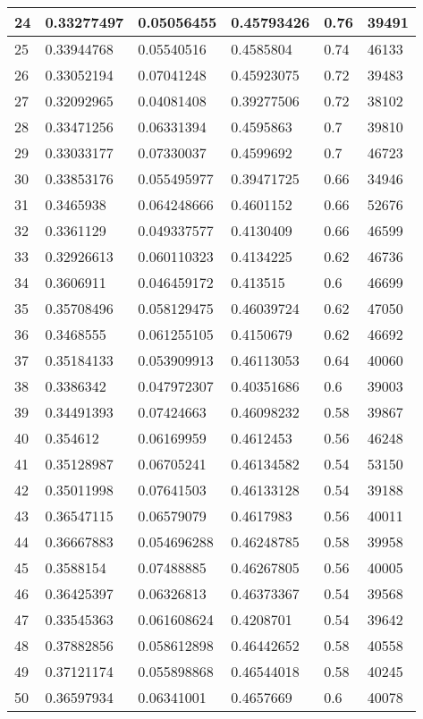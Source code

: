 \begin{longtable}{|l|l|l|l|l|l|}
24 & 0.33277497 & 0.05056455 & 0.45793426 & 0.76 & 39491 \\ \hline 
25 & 0.33944768 & 0.05540516 & 0.4585804 & 0.74 & 46133 \\ \hline 
26 & 0.33052194 & 0.07041248 & 0.45923075 & 0.72 & 39483 \\ \hline 
27 & 0.32092965 & 0.04081408 & 0.39277506 & 0.72 & 38102 \\ \hline 
28 & 0.33471256 & 0.06331394 & 0.4595863 & 0.7 & 39810 \\ \hline 
29 & 0.33033177 & 0.07330037 & 0.4599692 & 0.7 & 46723 \\ \hline 
30 & 0.33853176 & 0.055495977 & 0.39471725 & 0.66 & 34946 \\ \hline 
31 & 0.3465938 & 0.064248666 & 0.4601152 & 0.66 & 52676 \\ \hline 
32 & 0.3361129 & 0.049337577 & 0.4130409 & 0.66 & 46599 \\ \hline 
33 & 0.32926613 & 0.060110323 & 0.4134225 & 0.62 & 46736 \\ \hline 
34 & 0.3606911 & 0.046459172 & 0.413515 & 0.6 & 46699 \\ \hline 
35 & 0.35708496 & 0.058129475 & 0.46039724 & 0.62 & 47050 \\ \hline 
36 & 0.3468555 & 0.061255105 & 0.4150679 & 0.62 & 46692 \\ \hline 
37 & 0.35184133 & 0.053909913 & 0.46113053 & 0.64 & 40060 \\ \hline 
38 & 0.3386342 & 0.047972307 & 0.40351686 & 0.6 & 39003 \\ \hline 
39 & 0.34491393 & 0.07424663 & 0.46098232 & 0.58 & 39867 \\ \hline 
40 & 0.354612 & 0.06169959 & 0.4612453 & 0.56 & 46248 \\ \hline 
41 & 0.35128987 & 0.06705241 & 0.46134582 & 0.54 & 53150 \\ \hline 
42 & 0.35011998 & 0.07641503 & 0.46133128 & 0.54 & 39188 \\ \hline 
43 & 0.36547115 & 0.06579079 & 0.4617983 & 0.56 & 40011 \\ \hline 
44 & 0.36667883 & 0.054696288 & 0.46248785 & 0.58 & 39958 \\ \hline 
45 & 0.3588154 & 0.07488885 & 0.46267805 & 0.56 & 40005 \\ \hline 
46 & 0.36425397 & 0.06326813 & 0.46373367 & 0.54 & 39568 \\ \hline 
47 & 0.33545363 & 0.061608624 & 0.4208701 & 0.54 & 39642 \\ \hline 
48 & 0.37882856 & 0.058612898 & 0.46442652 & 0.58 & 40558 \\ \hline 
49 & 0.37121174 & 0.055898868 & 0.46544018 & 0.58 & 40245 \\ \hline 
50 & 0.36597934 & 0.06341001 & 0.4657669 & 0.6 & 40078 \\ \hline 
\end{longtable}
